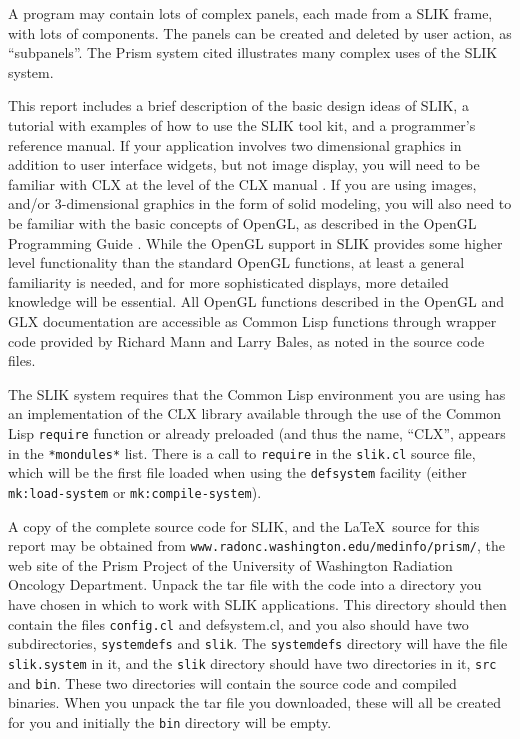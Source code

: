 \documentclass[twoside,openright,11pt]{report}
\newcommand{\tp}[1]{\texttt{#1}}
\begin{document}
A program may contain lots of complex panels, each made from a SLIK
frame, with lots of components.  The panels can be created and deleted
by user action, as ``subpanels''.  The Prism system cited illustrates
many complex uses of the SLIK system.

This report includes a brief description of the basic design ideas of
SLIK, a tutorial with examples of how to use the SLIK tool kit, and a
programmer's reference manual.  If your application involves two
dimensional graphics in addition to user interface widgets, but not
image display, you will need to be familiar with CLX at the level of
the CLX manual \cite{scheifler89}.  If you are using images, and/or
3-dimensional graphics in the form of solid modeling, you will also
need to be familiar with the basic concepts of OpenGL, as described in
the OpenGL Programming Guide \cite{opengl99}.  While the OpenGL
support in SLIK provides some higher level functionality than the
standard OpenGL functions, at least a general familiarity is needed,
and for more sophisticated displays, more detailed knowledge will be
essential.  All OpenGL functions described in the OpenGL and GLX
documentation are accessible as Common Lisp functions through wrapper
code provided by Richard Mann and Larry Bales, as noted in the source
code files.

The SLIK system requires that the Common Lisp environment you are
using has an implementation of the CLX library available through the
use of the Common Lisp \tp{require} function or already preloaded (and
thus the name, ``CLX'', appears in the \tp{*mondules*} list.  There is
a call to \tp{require} in the \tp{slik.cl} source file, which will be
the first file loaded when using the \tp{defsystem} facility (either
\tp{mk:load-system} or \tp{mk:compile-system}).

A copy of the complete source code for SLIK, and the \LaTeX\ source
for this report may be obtained from
\tp{www.radonc.washington.edu/medinfo/prism/}, the web site of the
Prism Project of the University of Washington Radiation Oncology
Department.  Unpack the tar file with the code into a directory you
have chosen in which to work with SLIK applications.  This directory
should then contain the files \tp{config.cl} and {defsystem.cl}, and
you also should have two subdirectories, \tp{systemdefs} and
\tp{slik}.  The \tp{systemdefs} directory will have the file
\tp{slik.system} in it, and the \tp{slik} directory should have two
directories in it, \tp{src} and \tp{bin}.  These two directories will
contain the source code and compiled binaries.  When you unpack the
tar file you downloaded, these will all be created for you and
initially the \tp{bin} directory will be empty.
\end{document}
